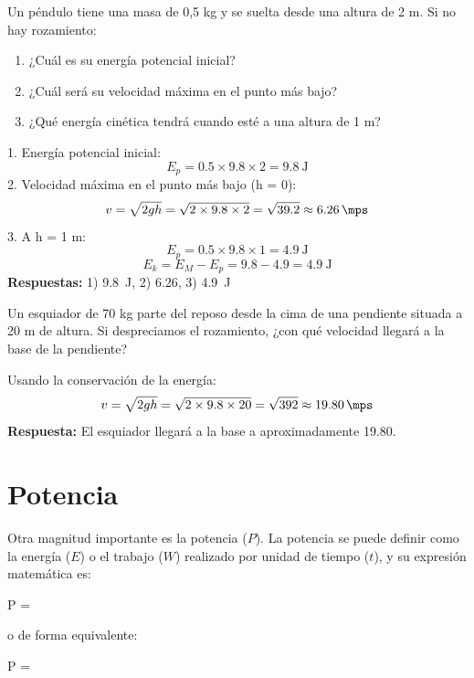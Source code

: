 \begin{exercise}
    Un péndulo tiene una masa de 0,5 kg y se suelta desde una altura de 2 m. Si no hay rozamiento:
    \begin{enumerate}
        \item ¿Cuál es su energía potencial inicial?
        \item ¿Cuál será su velocidad máxima en el punto más bajo?
        \item ¿Qué energía cinética tendrá cuando esté a una altura de 1 m?
    \end{enumerate}
    \begin{solu}
        1. Energía potencial inicial:
        \[
            E_p = 0.5 \times 9.8 \times 2 = \qty{9.8}{\joule}
        \]
        2. Velocidad máxima en el punto más bajo (h = 0):
        \[
            v = \sqrt{2gh} = \sqrt{2 \times 9.8 \times 2} = \sqrt{39.2} \approx \qty{6.26}{\mps}
        \]
        3. A h = 1 m:
        \[
            E_p = 0.5 \times 9.8 \times 1 = \qty{4.9}{\joule}
        \]
        \[
            E_k = E_M - E_p = 9.8 - 4.9 = \qty{4.9}{\joule}
        \]
        \textbf{Respuestas:} 1) \qty{9.8}{\joule}, 2) \qty{6.26}{\mps}, 3) \qty{4.9}{\joule}
    \end{solu}
\end{exercise}

\begin{exercise}
    Un esquiador de 70 kg parte del reposo desde la cima de una pendiente situada a 20 m de altura. Si despreciamos el rozamiento, ¿con qué velocidad llegará a la base de la pendiente?
    \begin{solu}
        Usando la conservación de la energía:
        \[
            v = \sqrt{2gh} = \sqrt{2 \times 9.8 \times 20} = \sqrt{392} \approx \qty{19.80}{\mps}
        \]
        \textbf{Respuesta:} El esquiador llegará a la base a aproximadamente \qty{19.80}{\mps}.
    \end{solu}
\end{exercise}


\section{Potencia}

Otra magnitud importante es la potencia (\( P \)). La potencia se puede definir como la energía (\( E \)) o el trabajo (\( W \)) realizado por unidad de tiempo (\( t \)), y su expresión matemática es:
\begin{centeredequation}
    P = 
    \label{eq:potencia_energia}
\end{centeredequation}
o de forma equivalente:
\begin{centeredequation}
    P = 
    \label{eq:potencia_trabajo}
\end{centeredequation}

